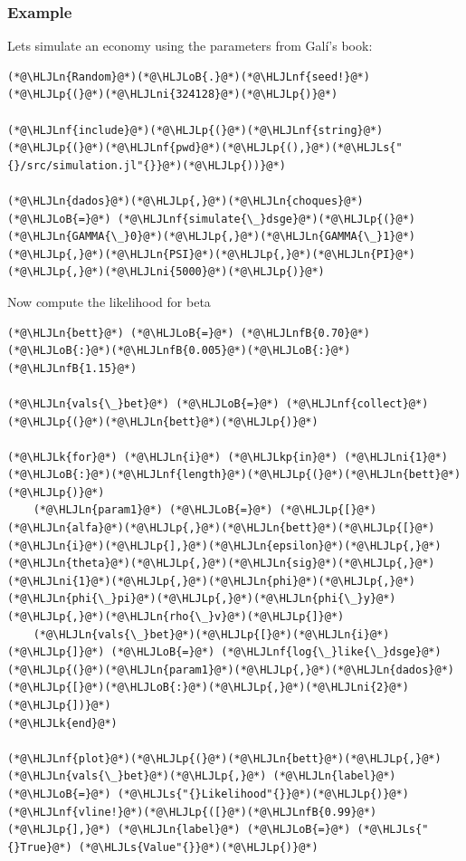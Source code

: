 \documentclass[12pt,a4paper]{article}
\newcommand{\HLJLk}[1]{\textcolor[RGB]{148,91,176}{\textbf{#1}}}
\newcommand{\HLJLkp}[1]{\textcolor[RGB]{148,91,176}{\textbf{#1}}}
\newcommand{\HLJLn}[1]{#1}
\newcommand{\HLJLnf}[1]{\textcolor[RGB]{66,102,213}{#1}}
\newcommand{\HLJLs}[1]{\textcolor[RGB]{201,61,57}{#1}}
\newcommand{\HLJLnfB}[1]{\textcolor[RGB]{59,151,46}{#1}}
\newcommand{\HLJLni}[1]{\textcolor[RGB]{59,151,46}{#1}}
\newcommand{\HLJLoB}[1]{\textcolor[RGB]{102,102,102}{\textbf{#1}}}
\newcommand{\HLJLp}[1]{#1}
\begin{document}
\subsubsection{Example}

Lets simulate an economy using the parameters from Galí's book:


\begin{lstlisting}
(*@\HLJLn{Random}@*)(*@\HLJLoB{.}@*)(*@\HLJLnf{seed!}@*)(*@\HLJLp{(}@*)(*@\HLJLni{324128}@*)(*@\HLJLp{)}@*)

(*@\HLJLnf{include}@*)(*@\HLJLp{(}@*)(*@\HLJLnf{string}@*)(*@\HLJLp{(}@*)(*@\HLJLnf{pwd}@*)(*@\HLJLp{(),}@*)(*@\HLJLs{"{}/src/simulation.jl"{}}@*)(*@\HLJLp{))}@*)

(*@\HLJLn{dados}@*)(*@\HLJLp{,}@*)(*@\HLJLn{choques}@*) (*@\HLJLoB{=}@*) (*@\HLJLnf{simulate{\_}dsge}@*)(*@\HLJLp{(}@*)(*@\HLJLn{GAMMA{\_}0}@*)(*@\HLJLp{,}@*)(*@\HLJLn{GAMMA{\_}1}@*)(*@\HLJLp{,}@*)(*@\HLJLn{PSI}@*)(*@\HLJLp{,}@*)(*@\HLJLn{PI}@*)(*@\HLJLp{,}@*)(*@\HLJLni{5000}@*)(*@\HLJLp{)}@*)
\end{lstlisting}


Now compute the likelihood for beta


\begin{lstlisting}
(*@\HLJLn{bett}@*) (*@\HLJLoB{=}@*) (*@\HLJLnfB{0.70}@*)(*@\HLJLoB{:}@*)(*@\HLJLnfB{0.005}@*)(*@\HLJLoB{:}@*)(*@\HLJLnfB{1.15}@*)

(*@\HLJLn{vals{\_}bet}@*) (*@\HLJLoB{=}@*) (*@\HLJLnf{collect}@*)(*@\HLJLp{(}@*)(*@\HLJLn{bett}@*)(*@\HLJLp{)}@*)

(*@\HLJLk{for}@*) (*@\HLJLn{i}@*) (*@\HLJLkp{in}@*) (*@\HLJLni{1}@*)(*@\HLJLoB{:}@*)(*@\HLJLnf{length}@*)(*@\HLJLp{(}@*)(*@\HLJLn{bett}@*)(*@\HLJLp{)}@*)
    (*@\HLJLn{param1}@*) (*@\HLJLoB{=}@*) (*@\HLJLp{[}@*)(*@\HLJLn{alfa}@*)(*@\HLJLp{,}@*)(*@\HLJLn{bett}@*)(*@\HLJLp{[}@*)(*@\HLJLn{i}@*)(*@\HLJLp{],}@*)(*@\HLJLn{epsilon}@*)(*@\HLJLp{,}@*)(*@\HLJLn{theta}@*)(*@\HLJLp{,}@*)(*@\HLJLn{sig}@*)(*@\HLJLp{,}@*)(*@\HLJLni{1}@*)(*@\HLJLp{,}@*)(*@\HLJLn{phi}@*)(*@\HLJLp{,}@*)(*@\HLJLn{phi{\_}pi}@*)(*@\HLJLp{,}@*)(*@\HLJLn{phi{\_}y}@*)(*@\HLJLp{,}@*)(*@\HLJLn{rho{\_}v}@*)(*@\HLJLp{]}@*)
    (*@\HLJLn{vals{\_}bet}@*)(*@\HLJLp{[}@*)(*@\HLJLn{i}@*)(*@\HLJLp{]}@*) (*@\HLJLoB{=}@*) (*@\HLJLnf{log{\_}like{\_}dsge}@*)(*@\HLJLp{(}@*)(*@\HLJLn{param1}@*)(*@\HLJLp{,}@*)(*@\HLJLn{dados}@*)(*@\HLJLp{[}@*)(*@\HLJLoB{:}@*)(*@\HLJLp{,}@*)(*@\HLJLni{2}@*)(*@\HLJLp{])}@*)
(*@\HLJLk{end}@*)

(*@\HLJLnf{plot}@*)(*@\HLJLp{(}@*)(*@\HLJLn{bett}@*)(*@\HLJLp{,}@*)(*@\HLJLn{vals{\_}bet}@*)(*@\HLJLp{,}@*) (*@\HLJLn{label}@*) (*@\HLJLoB{=}@*) (*@\HLJLs{"{}Likelihood"{}}@*)(*@\HLJLp{)}@*)
(*@\HLJLnf{vline!}@*)(*@\HLJLp{([}@*)(*@\HLJLnfB{0.99}@*)(*@\HLJLp{],}@*) (*@\HLJLn{label}@*) (*@\HLJLoB{=}@*) (*@\HLJLs{"{}True}@*) (*@\HLJLs{Value"{}}@*)(*@\HLJLp{)}@*)
\end{lstlisting}
\end{document}
